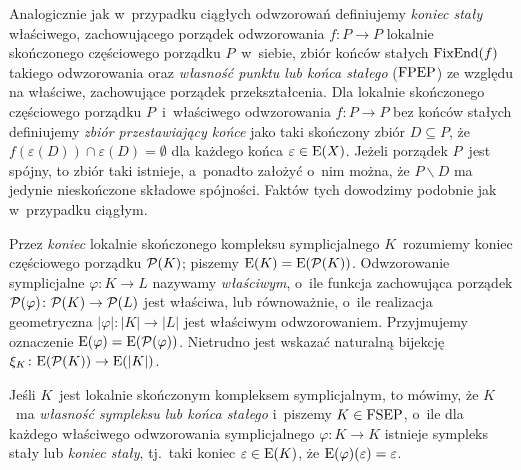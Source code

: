 Analogicznie jak w~przypadku ciągłych odwzorowań definiujemy \textit{koniec stały} właściwego, zachowującego porządek odwzorowania $f\colon P\to P$ lokalnie skończonego częściowego porządku $P$~w~siebie, zbiór końców stałych $\operatorname{FixEnd}(f)$ takiego odwzorowania oraz \textit{własność punktu lub końca stałego} ($\mathrm{FPEP}$) ze względu na właściwe, zachowujące porządek przekształcenia. Dla lokalnie skończonego częściowego porządku $P$~i~właściwego odwzorowania $f\colon P\to P$ bez końców stałych definiujemy \textit{zbiór przestawiający końce} jako taki skończony zbiór $D\subseteq P$, że $f(\varepsilon(D))\cap \varepsilon(D)=\emptyset$ dla każdego końca $\varepsilon\in\mathrm{E}(X)$. Jeżeli porządek $P$~jest spójny, to zbiór taki istnieje, a~ponadto założyć o~nim można, że $P\smallsetminus D$ ma jedynie nieskończone składowe spójności. Faktów tych dowodzimy podobnie jak w~przypadku ciągłym.

Przez \textit{koniec} lokalnie skończonego kompleksu symplicjalnego $K$~rozumiemy koniec częściowego porządku $\mathcal{P}(K)$; piszemy $\mathrm{E}(K)=\mathrm{E}(\mathcal{P}(K))$. Odwzorowanie symplicjalne $\varphi\colon K\to L$ nazywamy \textit{właściwym}, o~ile funkcja zachowująca porządek $\mathcal{P}(\varphi)\colon \mathcal{P}(K)\to\mathcal{P}(L)$ jest właściwa, lub równoważnie, o~ile realizacja geometryczna $|\varphi|\colon |K|\to |L|$ jest właściwym odwzorowaniem. Przyjmujemy oznaczenie $\mathrm{E}(\varphi)=\mathrm{E}(\mathcal{P}(\varphi))$. Nietrudno jest wskazać naturalną bijekcję $\xi_K\colon \mathrm{E}(\mathcal{P}(K))\to \mathrm{E}(|K|)$.

Jeśli $K$~jest lokalnie skończonym kompleksem symplicjalnym, to mówimy, że $K$~ma \textit{własność sympleksu lub końca stałego} i~piszemy $K\in\mathrm{FSEP}$, o~ile dla każdego właściwego odwzorowania symplicjalnego $\varphi\colon K\to K$ istnieje sympleks stały lub \textit{koniec stały}, tj.~taki koniec $\varepsilon\in \mathrm{E}(K)$, że $\mathrm{E}(\varphi)(\varepsilon)=\varepsilon$.

